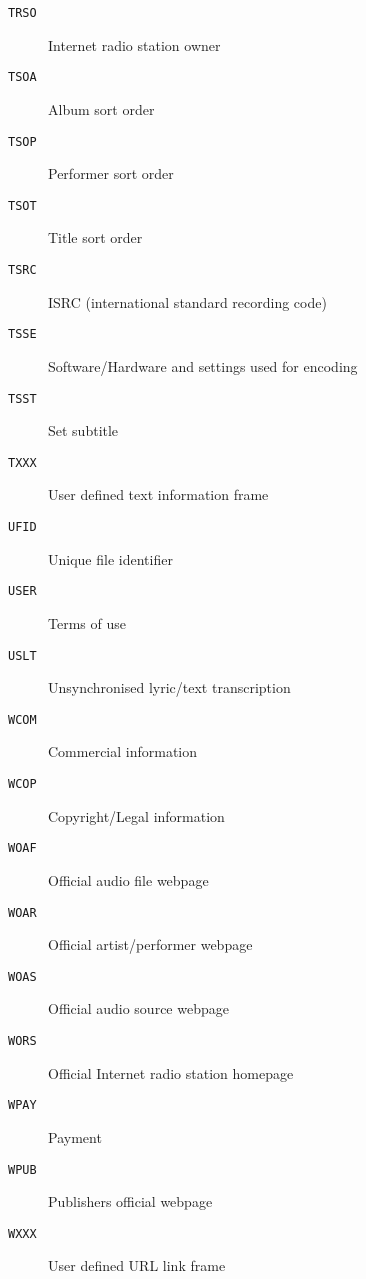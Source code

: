 \begin{multicols}{3}
{\begin{description}
\item[\texttt{TRSO}] Internet radio station owner
\item[\texttt{TSOA}] Album sort order
\item[\texttt{TSOP}] Performer sort order
\item[\texttt{TSOT}] Title sort order
\item[\texttt{TSRC}] ISRC (international standard recording code)
\item[\texttt{TSSE}] Software/Hardware and settings used for encoding
\item[\texttt{TSST}] Set subtitle
\item[\texttt{TXXX}] User defined text information frame
\item[\texttt{UFID}] Unique file identifier
\item[\texttt{USER}] Terms of use
\item[\texttt{USLT}] Unsynchronised lyric/text transcription
\item[\texttt{WCOM}] Commercial information
\item[\texttt{WCOP}] Copyright/Legal information
\item[\texttt{WOAF}] Official audio file webpage
\item[\texttt{WOAR}] Official artist/performer webpage
\item[\texttt{WOAS}] Official audio source webpage
\item[\texttt{WORS}] Official Internet radio station homepage
\item[\texttt{WPAY}] Payment
\item[\texttt{WPUB}] Publishers official webpage
\item[\texttt{WXXX}] User defined URL link frame
\end{description}
}
\end{multicols}



